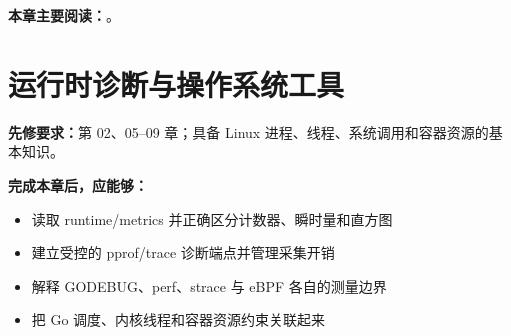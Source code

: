 \documentclass[UTF8,fontset=fandol,openany,11pt]{ctexbook}
\begin{document}
\medskip\noindent\textbf{本章主要阅读：}\cite{tools-delve-debug}\cite{tools-delve-exec}\cite{tools-delve-cli}\cite{tools-delve-core}\cite{tools-delve-compat}\cite{tools-runtime-debug}\cite{tools-crash-output}。
\chapter{运行时诊断与操作系统工具}
\label{ch:10}
\par\medskip
\noindent\textbf{先修要求：}第 02、05–09 章；具备 Linux 进程、线程、系统调用和容器资源的基本知识。

\noindent\textbf{完成本章后，应能够：}
\begin{itemize}
\item 读取 runtime/metrics 并正确区分计数器、瞬时量和直方图
\item 建立受控的 pprof/trace 诊断端点并管理采集开销
\item 解释 GODEBUG、perf、strace 与 eBPF 各自的测量边界
\item 把 Go 调度、内核线程和容器资源约束关联起来
\end{itemize}
\end{document}
